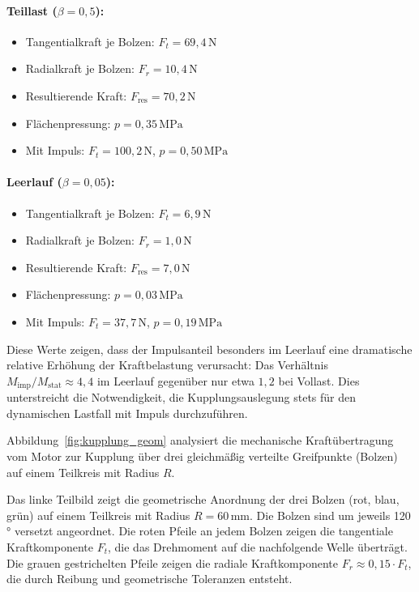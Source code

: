 ﻿\documentclass[a4paper,12pt]{article}
\begin{document}
\paragraph{Teillast ($\beta = 0{,}5$):}
\begin{itemize}
  \item Tangentialkraft je Bolzen: $F_t = 69{,}4\,\text{N}$
  \item Radialkraft je Bolzen: $F_r = 10{,}4\,\text{N}$
  \item Resultierende Kraft: $F_\text{res} = 70{,}2\,\text{N}$
  \item Flächenpressung: $p = 0{,}35\,\text{MPa}$
  \item Mit Impuls: $F_t = 100{,}2\,\text{N}$, $p = 0{,}50\,\text{MPa}$
\end{itemize}

\paragraph{Leerlauf ($\beta = 0{,}05$):}
\begin{itemize}
  \item Tangentialkraft je Bolzen: $F_t = 6{,}9\,\text{N}$
  \item Radialkraft je Bolzen: $F_r = 1{,}0\,\text{N}$
  \item Resultierende Kraft: $F_\text{res} = 7{,}0\,\text{N}$
  \item Flächenpressung: $p = 0{,}03\,\text{MPa}$
  \item Mit Impuls: $F_t = 37{,}7\,\text{N}$, $p = 0{,}19\,\text{MPa}$
\end{itemize}

Diese Werte zeigen, dass der Impulsanteil besonders im Leerlauf eine dramatische
relative Erhöhung der Kraftbelastung verursacht: Das Verhältnis
$M_\text{imp}/M_\text{stat} \approx 4{,}4$ im Leerlauf gegenüber nur etwa
$1{,}2$ bei Vollast. Dies unterstreicht die Notwendigkeit, die Kupplungsauslegung
stets für den dynamischen Lastfall mit Impuls durchzuführen.

Abbildung~\ref{fig:kupplung_geom} analysiert die mechanische Kraftübertragung
vom Motor zur Kupplung über drei gleichmäßig verteilte Greifpunkte (Bolzen)
auf einem Teilkreis mit Radius $R$.

Das linke Teilbild zeigt die geometrische Anordnung der drei Bolzen
(rot, blau, grün) auf einem Teilkreis mit Radius $R = 60\,\text{mm}$.
Die Bolzen sind um jeweils 120 ° versetzt angeordnet. Die roten Pfeile
an jedem Bolzen zeigen die tangentiale Kraftkomponente $F_t$, die das
Drehmoment auf die nachfolgende Welle überträgt. Die grauen gestrichelten
Pfeile zeigen die radiale Kraftkomponente $F_r \approx 0{,}15 \cdot F_t$,
die durch Reibung und geometrische Toleranzen entsteht.
\end{document}
